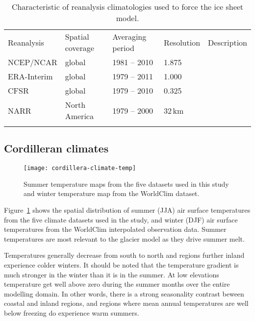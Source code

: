 \begin{table}[t]
	\caption{Characteristic of reanalysis climatologies used to force the ice sheet model.}
	\label{tab:reanalyses}
	\vskip4mm
	\centering
	\begin{tabular}{lllll}
		\tophline
		Reanalysis& Spatial coverage& Averaging period& Resolution& Description\\
		\middlehline
		NCEP/NCAR&  global&     1981 -- 2010& 1.875\degree& \citet{data:ncar}\\
		ERA-Interim&global&     1979 -- 2011& 1.000\degree& \citet{data:erai}\\
		CFSR&       global&     1979 -- 2010& 0.325\degree& \citet{data:cfsr}\\
		NARR&       North America& 1979 -- 2000& 32\,km& \citet{data:narr}\\
		\bottomhline
	\end{tabular}
\end{table}


\subsection{Cordilleran climates}


\begin{figure}[t]
	\vspace*{2mm}
	\begin{center}
		\texttt{[image: cordillera-climate-temp]}
	\end{center}
	\caption{Summer temperature maps from the five datasets used in this study and winter temperature map from the WorldClim dataset.}
	\label{fig:temp}
\end{figure}

Figure~\ref{fig:temp} shows the spatial distribution of summer (JJA) air surface temperatures from the five climate datasets used in the study, and winter (DJF) air surface temperatures from the WorldClim interpolated observation data. Summer temperatures are most relevant to the glacier model as they drive summer melt.

Temperatures generally decrease from south to north and regions further inland experience colder winters. It should be noted that the temperature gradient is much stronger in the winter than it is in the summer. At low elevations temperature get well above zero during the summer months over the entire modelling domain. In other words, there is a strong seasonality contrast beween coastal and inland regions, and regions where mean annual temperatures are well below freezing do experience warm summers.

